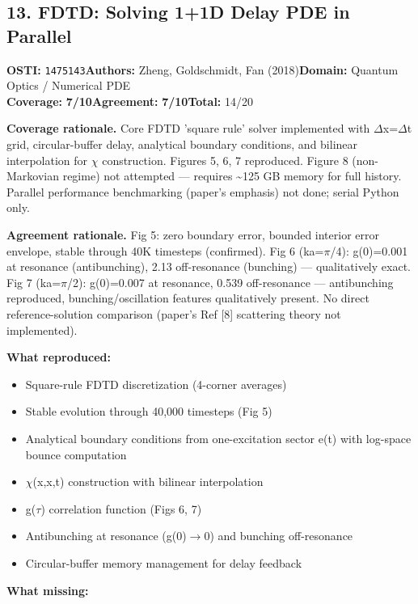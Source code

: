 \documentclass[11pt]{article}
\newcommand{\scorebadge}[2]{\textbf{#1:} \textbf{#2/10}}
\begin{document}
\subsection{13. FDTD: Solving 1+1D Delay PDE in Parallel}
\textbf{OSTI:} \texttt{1475143}\quad\textbf{Authors:} Zheng, Goldschmidt, Fan (2018)\quad\textbf{Domain:} Quantum Optics / Numerical PDE\\
\scorebadge{Coverage}{7}\quad\scorebadge{Agreement}{7}\quad\textbf{Total:} 14/20\par\smallskip
\noindent\textbf{Coverage rationale.} Core FDTD 'square rule' solver implemented with $\Delta$x=$\Delta$t grid, circular-buffer delay, analytical boundary conditions, and bilinear interpolation for $\chi$ construction. Figures 5, 6, 7 reproduced. Figure 8 (non-Markovian regime) not attempted --- requires \textasciitilde{}125 GB memory for full  history. Parallel performance benchmarking (paper's emphasis) not done; serial Python only.\par
\noindent\textbf{Agreement rationale.} Fig 5: zero boundary error, bounded interior error envelope, stable through 40K timesteps (confirmed). Fig 6 (ka=$\pi$/4): g(0)=0.001 at resonance (antibunching), 2.13 off-resonance (bunching) --- qualitatively exact. Fig 7 (ka=$\pi$/2): g(0)=0.007 at resonance, 0.539 off-resonance --- antibunching reproduced, bunching/oscillation features qualitatively present. No direct reference-solution comparison (paper's Ref [8] scattering theory not implemented).\par\smallskip
\noindent\textbf{What reproduced:}
\begin{itemize}[leftmargin=1.4em,itemsep=0.2em,topsep=0.2em]
\item Square-rule FDTD discretization (4-corner averages)
\item Stable  evolution through 40,000 timesteps (Fig 5)
\item Analytical boundary conditions from one-excitation sector e(t) with log-space bounce computation
\item $\chi$(x,x,t) construction with bilinear interpolation
\item g($\tau$) correlation function (Figs 6, 7)
\item Antibunching at resonance (g(0)$\rightarrow$0) and bunching off-resonance
\item Circular-buffer memory management for delay feedback
\end{itemize}\noindent\textbf{What missing:}
\end{document}
